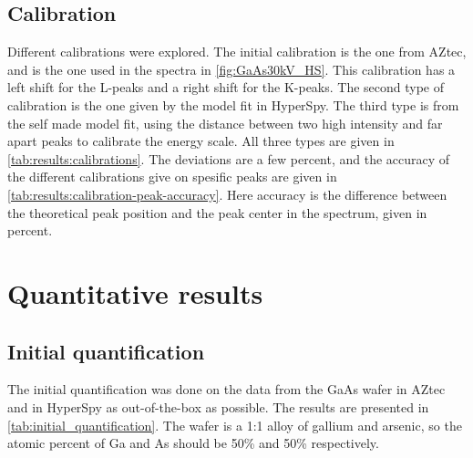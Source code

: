 

\subsection{Calibration}
\label{sec:results:qualitative:calibration}

Different calibrations were explored.
The initial calibration is the one from AZtec, and is the one used in the spectra in \cref{fig:GaAs30kV_HS}.
This calibration has a left shift for the L-peaks and a right shift for the K-peaks.
The second type of calibration is the one given by the model fit in HyperSpy.
The third type is from the self made model fit, using the distance between two high intensity and far apart peaks to calibrate the energy scale.
All three types are given in \ref{tab:results:calibrations}.
The deviations are a few percent, and the accuracy of the different calibrations give on spesific peaks are given in \cref{tab:results:calibration-peak-accuracy}.
Here accuracy is the difference between the theoretical peak position and the peak center in the spectrum, given in percent.







\section{Quantitative results}
\label{sec:results:quantification}


\subsection{Initial quantification}
\label{sec:results:initial_quantification}

The initial quantification was done on the data from the GaAs wafer in AZtec and in HyperSpy as out-of-the-box as possible.
The results are presented in \cref{tab:initial_quantification}.
The wafer is a 1:1 alloy of gallium and arsenic, so the atomic percent of Ga and As should be 50\% and 50\% respectively.

